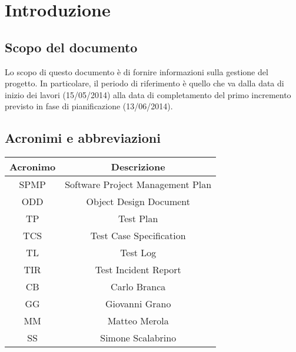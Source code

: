 \chapter{Introduzione}
\section{Scopo del documento}
Lo scopo di questo documento è di fornire informazioni sulla gestione del progetto. In particolare, il periodo di riferimento è quello che va dalla data di inizio dei lavori (15/05/2014) alla data di completamento del primo incremento previsto in fase di pianificazione (13/06/2014).

\section{Acronimi e abbreviazioni}
\begin{table}[ht]
\centering
\begin{tabular}{|c|c|}
 \hline
 \rowcolor{Gray}\textbf{Acronimo}			& \textbf{Descrizione}				\\
 \hline
 SPMP							& Software Project Management Plan		\\
 \hline
 ODD							& Object Design Document			\\
 \hline
 TP							& Test Plan					\\
 \hline
 TCS							& Test Case Specification			\\
 \hline
 TL							& Test Log					\\
 \hline
 TIR							& Test Incident Report				\\
 \hline
 CB							& Carlo Branca					\\
 \hline
 GG							& Giovanni Grano				\\
 \hline
 MM							& Matteo Merola					\\
 \hline
 SS							& Simone Scalabrino				\\
 \hline
\end{tabular}
\end{table}